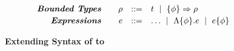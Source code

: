 
\begin{figure}[t!]
$$
\begin{array}{rrcl}
\centering

\emphbf{Bounded Types} \quad 
  & \bt         & ::= & \rtyp 
                        \spmid \tconstraint{\constraint}{\bt} \\[0.03in]

\emphbf{Expressions} \quad 
  & e           & ::= & \dots 
                        \spmid \econstraint{\constraint}{e} 
                        \spmid \econstantconstraint{e}{\constraint} \\
\end{array}
$$
\caption{\textbf{Extending Syntax of \corelan to \boundedcorelan}} 
\label{fig:boundedsyntax}
\end{figure}

